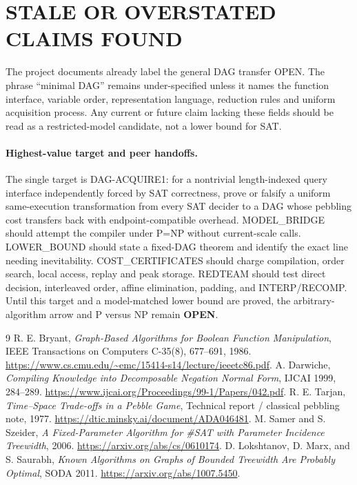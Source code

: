 \documentclass[11pt]{article}
\begin{document}
\section{STALE OR OVERSTATED CLAIMS FOUND}
The project documents already label the general DAG transfer OPEN.  The
phrase ``minimal DAG'' remains under-specified unless it names the function
interface, variable order, representation language, reduction rules and
uniform acquisition process.  Any current or future claim lacking these
fields should be read as a restricted-model candidate, not a lower bound for
SAT.

\paragraph{Highest-value target and peer handoffs.}
The single target is \textsf{DAG-ACQUIRE1}: for a nontrivial length-indexed
query interface independently forced by SAT correctness, prove or falsify a
uniform same-execution transformation from every SAT decider to a DAG whose
pebbling cost transfers back with endpoint-compatible overhead.
MODEL\_BRIDGE should attempt the compiler under P=NP without current-scale
calls.  LOWER\_BOUND should state a fixed-DAG theorem and identify the exact
line needing inevitability.  COST\_CERTIFICATES should charge compilation,
order search, local access, replay and peak storage.  REDTEAM should test
direct decision, interleaved order, affine elimination, padding, and
INTERP/RECOMP.  Until this target and a model-matched lower bound are proved,
the arbitrary-algorithm arrow and P versus NP remain \textbf{OPEN}.

\begin{thebibliography}{9}
 R. E. Bryant,
\emph{Graph-Based Algorithms for Boolean Function Manipulation}, IEEE
Transactions on Computers C-35(8), 677--691, 1986.
\url{https://www.cs.cmu.edu/~emc/15414-s14/lecture/ieeetc86.pdf}.
 A. Darwiche,
\emph{Compiling Knowledge into Decomposable Negation Normal Form}, IJCAI
1999, 284--289.
\url{https://www.ijcai.org/Proceedings/99-1/Papers/042.pdf}.
 R. E. Tarjan,
\emph{Time--Space Trade-offs in a Pebble Game}, Technical report / classical
pebbling note, 1977.
\url{https://dtic.minsky.ai/document/ADA046481}.
 M. Samer and S. Szeider,
\emph{A Fixed-Parameter Algorithm for \#SAT with Parameter Incidence
Treewidth}, 2006. \url{https://arxiv.org/abs/cs/0610174}.
 D. Lokshtanov, D. Marx, and S. Saurabh,
\emph{Known Algorithms on Graphs of Bounded Treewidth Are Probably Optimal},
SODA 2011. \url{https://arxiv.org/abs/1007.5450}.
\end{thebibliography}

\end{document}
